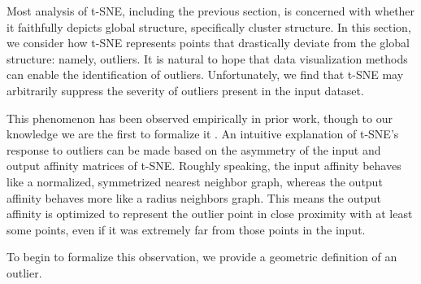 

Most analysis of t-SNE, including the previous section, is concerned with whether it faithfully depicts global structure, specifically cluster structure. In this section, we consider how t-SNE represents points that drastically deviate from the global structure: namely, outliers. It is natural to hope that data visualization methods can enable the identification of outliers. Unfortunately, we find that t-SNE may arbitrarily suppress the severity of outliers present in the input dataset.



This phenomenon has been observed empirically in prior work, though  to our knowledge we are the first to formalize it \citep{Schubert2017}. An intuitive explanation of t-SNE's response to outliers can be made based on the asymmetry of the input and output affinity matrices of t-SNE. Roughly speaking, the input affinity behaves like a normalized, symmetrized nearest neighbor graph, whereas the output affinity behaves more like a radius neighbors graph. This means the output affinity is optimized to represent the outlier point in close proximity with at least some points, even if it was extremely far from those points in the input. %

To begin to formalize this observation, we provide a geometric definition of an outlier.

